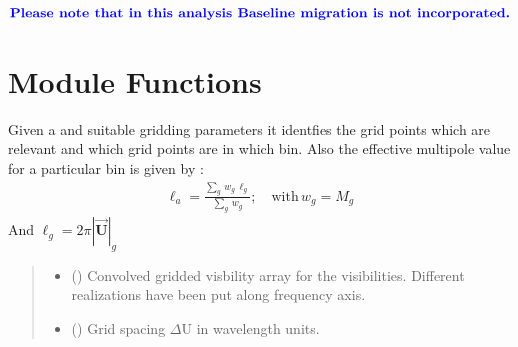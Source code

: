 \documentclass[a4paper,11pt,oneside,english,openany]{sphinxmanual}
\begin{document}
\sphinxAtStartPar
\(\textcolor{blue}{\rm \textbf{Please note that in this analysis Baseline migration is not incorporated.}}\)

\clearpage


\section{Module Functions}
\label{\detokenize{grid:module-functions}}

\begin{fulllineitems}
\label{\detokenize{grid:grid.mkbin}}
\pysigstartsignatures
{}
\pysigstopsignatures
\sphinxAtStartPar
Given a  and suitable gridding parameters it identfies the grid points which are relevant and which grid points are in which bin.
Also the effective multipole value for a particular bin is given by :
\begin{equation*}
\begin{split}\ell_a = \frac{\sum_g\,w_g\,\ell_g}{\sum_g\,w_g}; \quad \text{with}\, w_g = M_g\end{split}
\end{equation*}
\sphinxAtStartPar
And \(\ell_g = 2\pi |\vec{\textbf{U}}|_{g}\)
\begin{quote}\begin{description}
\begin{itemize}
\item {} 
\sphinxAtStartPar
{} () \textendash{} Convolved gridded visbility array for the  visibilities. Different realizations have been put along frequency axis.

\item {} 
\sphinxAtStartPar
{} () \textendash{} Grid spacing \(\Delta \text{U}\) in wavelength units.


\end{itemize}
\end{description}
\end{quote}
\end{fulllineitems}
\end{document}

